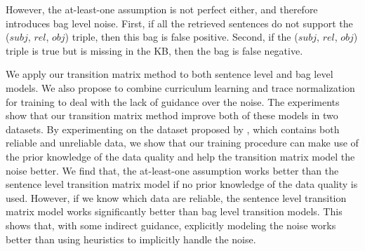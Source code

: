 \documentclass[11pt,a4paper]{article}
\newcommand{\todo}[1]{\textcolor{red}{TODO: #1}\PackageWarning{TODO:}{#1!}}
\begin{document}

However, the at-least-one assumption is not perfect either, and therefore introduces bag level noise. First, if all the retrieved sentences do not support the ($subj$, $rel$, $obj$) triple, then this bag is false positive. Second, if the ($subj$, $rel$, $obj$) triple is true but is missing in the KB, then the bag is false negative. 

We apply our transition matrix method to both sentence level and bag level models. We also propose to combine curriculum learning and trace normalization for training to deal with the lack of guidance over the noise. The experiments show that our transition matrix method improve both of these models in two datasets. By experimenting on the dataset proposed by \cite{luo2016temporal}, which contains both reliable and unreliable data, we show that our training procedure can make use of the prior knowledge of the data quality and help the transition matrix model the noise better. We find that, the at-least-one assumption works better than the sentence level transition matrix model if no prior knowledge of the data quality is used. However, if we know which data are reliable, the sentence level transition matrix model works significantly better than bag level transition models. This shows that, with some indirect guidance, explicitly modeling the noise works better than using heuristics to implicitly handle the noise.

\end{document}
